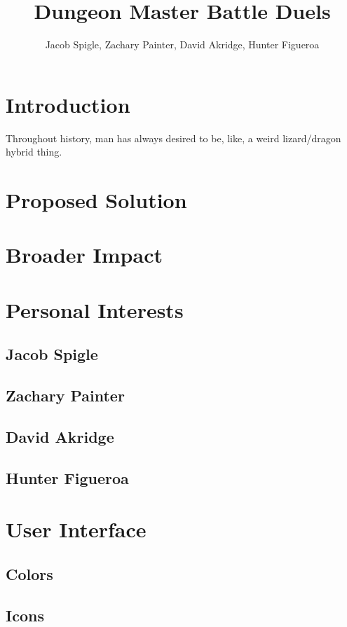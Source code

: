 \documentclass[12pt,a4paper]{report}
\author{Jacob Spigle, Zachary Painter, David Akridge, Hunter Figueroa}
\title{Dungeon Master Battle Duels}
\begin{document}
	
	\maketitle
	
	\tableofcontents
	
	\newpage
	\section{Introduction}
	Throughout history, man has always desired to be, like, a weird lizard/dragon hybrid thing.
	
	\newpage
	\section{Proposed Solution}
	
	\newpage
	\section{Broader Impact}
	
	\newpage
	\section{Personal Interests}
		\subsection{Jacob Spigle}
		\subsection{Zachary Painter}
		\subsection{David Akridge}
		\subsection{Hunter Figueroa}
	
	\newpage
	\section{User Interface}
		\subsection{Colors}
		\subsection{Icons}
\end{document}
